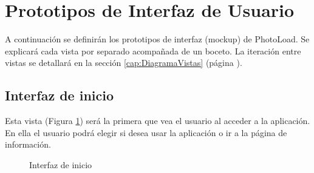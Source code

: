 \documentclass{scrartcl}
\begin{document}
\section{Prototipos de Interfaz de Usuario}\label{cap:prototipos interfaz}
A continuación se definirán los prototipos de interfaz (mockup) de PhotoLoad. Se explicará cada vista por separado acompañada de un boceto. La iteración entre vistas se detallará en la sección \ref{cap:DiagramaVistas} (página \pageref{cap:DiagramaVistas}).
\subsection{Interfaz de inicio}\label{cap:InterfazInicio}
Esta vista (Figura \ref{fig:VistaLogin}) será la primera que vea el usuario al acceder a la aplicación. En ella el usuario podrá elegir si desea usar la aplicación o ir a la página de información.

\begin{figure}[H]
	
	\centering
	\caption{Interfaz de inicio}
	\label{fig:VistaLogin}
	
\end{figure}

\end{document}
